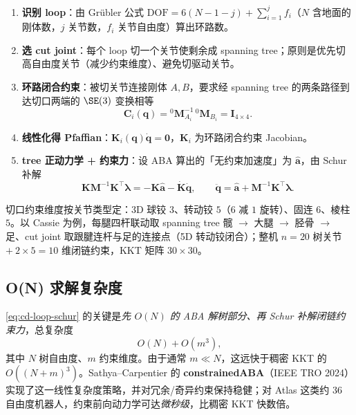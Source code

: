 \begin{enumerate}
  \item \textbf{识别 loop}：由 Grübler 公式 $\mathrm{DOF}=6(N-1-j)+\sum_{i=1}^j f_i$（$N$ 含地面的刚体数，$j$ 关节数，$f_i$ 关节自由度）算出环路数。
  \item \textbf{选 cut joint}：每个 loop 切一个关节使剩余成 spanning tree；原则是优先切高自由度关节（减少约束维度）、避免切驱动关节。
  \item \textbf{环路闭合约束}：被切关节连接刚体 $A,B$，要求经 spanning tree 的两条路径到达切口两端的 $\SE(3)$ 变换相等
  \begin{equation}
    \mathbf C_i(\mathbf q)={}^0\mathbf M_{A_i}^{-1}\,{}^0\mathbf M_{B_i}=\mathbf I_{4\times4}.
    \label{eq:cd-loopclosure}
  \end{equation}
  \item \textbf{线性化得 Pfaffian}：$\mathbf K_i(\mathbf q)\dot{\mathbf q}=\mathbf 0$，$\mathbf K_i$ 为环路闭合约束 Jacobian。
  \item \textbf{tree 正动力学 + 约束力}：设 ABA 算出的「无约束加速度」为 $\hat{\mathbf a}$，由 Schur 补解
  \begin{equation}
    \mathbf K\mathbf M^{-1}\mathbf K^\top\boldsymbol\lambda=-\mathbf K\hat{\mathbf a}-\dot{\mathbf K}\dot{\mathbf q},\qquad \ddot{\mathbf q}=\hat{\mathbf a}+\mathbf M^{-1}\mathbf K^\top\boldsymbol\lambda.
    \label{eq:cd-loop-schur}
  \end{equation}
\end{enumerate}

切口约束维度按关节类型定：3D 球铰 $3$、转动铰 $5$（$6$ 减 $1$ 旋转）、固连 $6$、棱柱 $5$。以 Cassie 为例，每腿四杆联动取 spanning tree 髋 $\to$ 大腿 $\to$ 胫骨 $\to$ 足、cut joint 取跟腱连杆与足的连接点（5D 转动铰闭合）；整机 $n=20$ 树关节 $+\ 2\times5=10$ 维闭链约束，KKT 矩阵 $30\times30$。

\subsection{O(N) 求解复杂度}
\cref{eq:cd-loop-schur} 的关键是\emph{先 $O(N)$ 的 ABA 解树部分、再 Schur 补解闭链约束力}，总复杂度
\begin{equation}
  O(N)+O(m^3),
  \label{eq:cd-loop-complexity}
\end{equation}
其中 $N$ 树自由度、$m$ 约束维度。由于通常 $m\ll N$，这远快于稠密 KKT 的 $O((N+m)^3)$。Sathya--Carpentier 的 \textbf{constrainedABA}\cite{sathya2024constrained}（IEEE TRO 2024）实现了这一线性复杂度策略，并对冗余/奇异约束保持稳健；对 Atlas 这类约 $36$ 自由度机器人，约束前向动力学可达\emph{微秒级}，比稠密 KKT 快数倍。

